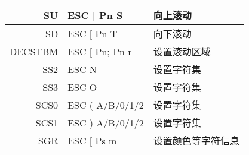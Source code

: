 \begin{longtable}{|r|l|l|}
SU & ESC [ Pn S &向上滚动 \\ \hline
SD & ESC [ Pn T &向下滚动 \\ \hline
DECSTBM & ESC [ Pn; Pn r &设置滚动区域 \\ \hline \hline

SS2 & ESC N&设置字符集 \\ \hline
SS3 & ESC O&设置字符集 \\ \hline
SCS0 & ESC ( A/B/0/1/2 & 设置字符集 \\ \hline
SCS1 & ESC ) A/B/0/1/2 &设置字符集 \\ \hline \hline

SGR & ESC [ Ps m &设置颜色等字符信息 \\ \hline
\end{longtable}
